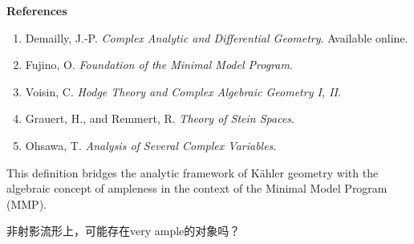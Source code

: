 \documentclass[lang=cn,zihao=-4,a4paper,fontset=none]{beautybook}
\begin{document}
\textbf{References}
\begin{enumerate}
    \item Demailly, J.-P. \emph{Complex Analytic and Differential Geometry}. Available online.  
    \item Fujino, O. \emph{Foundation of the Minimal Model Program}.  
    \item Voisin, C. \emph{Hodge Theory and Complex Algebraic Geometry I, II}.  
    \item Grauert, H., and Remmert, R. \emph{Theory of Stein Spaces}.  
    \item Ohsawa, T. \emph{Analysis of Several Complex Variables}.
\end{enumerate}

This definition bridges the analytic framework of Kähler geometry with the algebraic concept of ampleness in the context of the Minimal Model Program (MMP).



\begin{problem}[][问题2][prob:2]
    非射影流形上，可能存在very ample的对象吗？
\end{problem}
    
\end{document}
